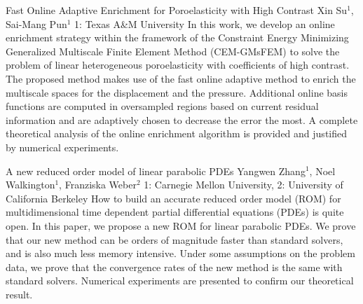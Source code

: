 \begin{addmargin}[2em]{0em}
\vspace{1.5ex}
\abs
{Fast Online Adaptive Enrichment for Poroelasticity with High Contrast}
{Xin Su$^{1}$, Sai-Mang Pun$^{1}$}
{1: Texas A\&M University}
{In this work, we develop an online enrichment strategy within the framework of the Constraint Energy Minimizing Generalized Multiscale Finite Element Method (CEM-GMsFEM) to solve the problem of linear heterogeneous poroelasticity with coefficients of high contrast. The proposed method makes use of the fast online adaptive method to enrich the multiscale spaces for the displacement and the pressure. Additional online basis functions are computed in oversampled regions based on current residual information and are adaptively chosen to decrease the error the most. A complete theoretical analysis of the online enrichment algorithm is provided and justified by numerical experiments.
}


\vspace{1.5ex}
\abs
{A new reduced order model of  linear parabolic PDEs}
{Yangwen Zhang$^{1}$, Noel Walkington$^{1}$, Franziska Weber$^{2}$}
{1: Carnegie Mellon University, 2: University of California Berkeley}
{How to build an accurate reduced order model (ROM) for  multidimensional time dependent partial differential equations (PDEs) is quite open. In this paper, we propose a new ROM for linear parabolic PDEs.  We prove that our new method can be orders of magnitude faster than
standard solvers, and is also much less memory intensive. Under some assumptions on the problem data, we prove that the convergence rates of the new method is the same with standard solvers. Numerical experiments are presented to confirm our theoretical result.}

\end{addmargin}

